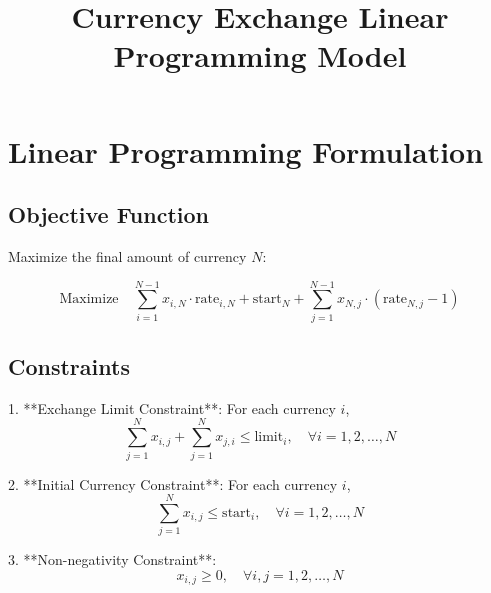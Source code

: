 \documentclass{article}
\begin{document}
\title{Currency Exchange Linear Programming Model}
\author{}
\date{}
\maketitle

\section*{Linear Programming Formulation}

\subsection*{Objective Function}

Maximize the final amount of currency \( N \):

\[
\text{Maximize} \quad \sum_{i=1}^{N-1} x_{i,N} \cdot \text{rate}_{i,N} + \text{start}_N + \sum_{j=1}^{N-1} x_{N,j} \cdot (\text{rate}_{N,j} - 1)
\]

\subsection*{Constraints}

1. **Exchange Limit Constraint**: For each currency \( i \),
   \[
   \sum_{j=1}^{N} x_{i,j} + \sum_{j=1}^{N} x_{j,i} \leq \text{limit}_i, \quad \forall i = 1, 2, \ldots, N
   \]

2. **Initial Currency Constraint**: For each currency \( i \),
   \[
   \sum_{j=1}^{N} x_{i,j} \leq \text{start}_i, \quad \forall i = 1, 2, \ldots, N
   \]

3. **Non-negativity Constraint**: 
    \[
    x_{i,j} \geq 0, \quad \forall i,j = 1, 2, \ldots, N
    \]
\end{document}
